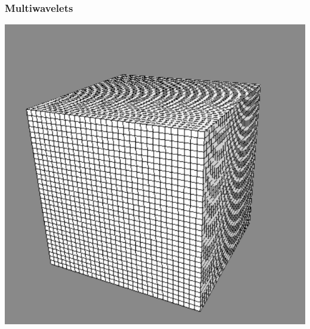 \begin{frame}
    \frametitle{Multiwavelets}
    \centering
    \includegraphics[scale=0.35]{figures/unifgrid.pdf}
\end{frame}

